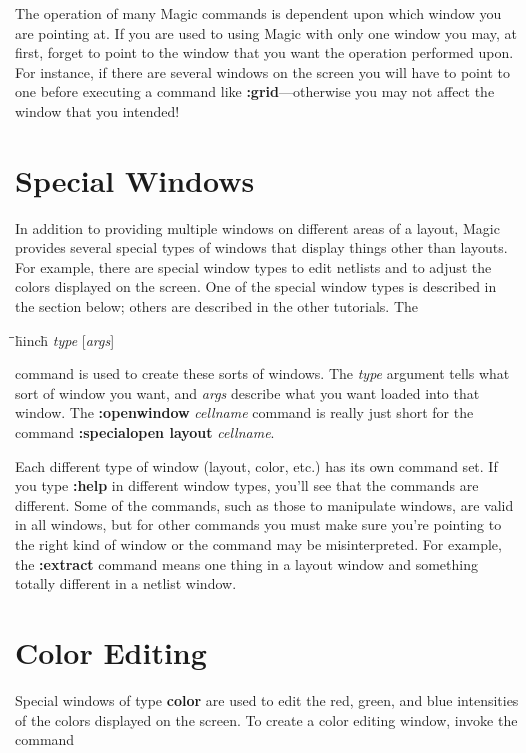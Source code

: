 \documentclass[letterpaper,twoside,12pt]{article}
\def\hinch{\hspace*{0.5in}}
\def\starti{\begin{center}\begin{tabbing}\hinch\=\hinch\=\hinch\=hinch\hinch\=\kill}
\def\endi{\end{tabbing}\end{center}}
\def\ii{\>\>\>}
\begin{document}
The operation of many Magic commands is dependent upon which window you
are pointing at.  If you are used to using Magic with only one window
you may, at first, forget to point to the window that you want the
operation performed upon.  For instance, if there are several windows
on the screen you will have to point to one before executing a
command like {\bfseries :grid}---otherwise you may not affect the window
that you intended!

\section{Special Windows}

In addition to providing multiple windows on different areas of
a layout, Magic provides several special types of windows that
display things other than layouts.  For example, there are special
window types to edit netlists and to
adjust the colors displayed on the screen.  One of the
special window types is described in the section below;
others are
described in the other tutorials.
The 

\starti
   \ii {\bfseries :specialopen} {\itshape type }[{\itshape args}]
\endi

command is used to create these
sorts of windows.  The {\itshape type} argument tells what sort of window
you want, and {\itshape args} describe what you want loaded into that window.
The {\bfseries :openwindow} {\itshape cellname} command is really just short for the
command {\bfseries :specialopen layout} {\itshape cellname}.

Each different type of window (layout, color, etc.) has its own
command set.  If you type {\bfseries :help} in different window types,
you'll see that the commands are different.  Some of the commands,
such as those to manipulate windows, are valid in all windows, but
for other commands you must make sure you're pointing to the right
kind of window or the command may be misinterpreted.  For example,
the {\bfseries :extract} command means one thing in a layout window and
something totally different in a netlist window.

\section{Color Editing}

Special windows of type {\bfseries color} are used to edit the red, green,
and blue intensities of the colors displayed on the screen.  To
create a color editing window, invoke the command
\end{document}
